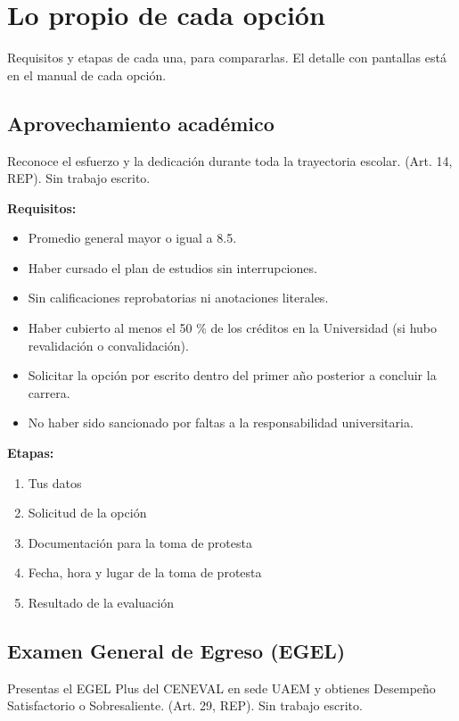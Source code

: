 \section{Lo propio de cada opción}
Requisitos y etapas de cada una, para compararlas. El detalle con pantallas está en el manual de cada opción.
\subsection{Aprovechamiento académico}
Reconoce el esfuerzo y la dedicación durante toda la trayectoria escolar. (Art. 14, REP). Sin trabajo escrito.

\textbf{Requisitos:}
\begin{itemize}
  \item Promedio general mayor o igual a 8.5.
  \item Haber cursado el plan de estudios sin interrupciones.
  \item Sin calificaciones reprobatorias ni anotaciones literales.
  \item Haber cubierto al menos el 50 \% de los créditos en la Universidad (si hubo revalidación o convalidación).
  \item Solicitar la opción por escrito dentro del primer año posterior a concluir la carrera.
  \item No haber sido sancionado por faltas a la responsabilidad universitaria.
\end{itemize}
\textbf{Etapas:}
\begin{enumerate}
  \item Tus datos
  \item Solicitud de la opción
  \item Documentación para la toma de protesta
  \item Fecha, hora y lugar de la toma de protesta
  \item Resultado de la evaluación
\end{enumerate}
\subsection{Examen General de Egreso (EGEL)}
Presentas el EGEL Plus del CENEVAL en sede UAEM y obtienes Desempeño Satisfactorio o Sobresaliente. (Art. 29, REP). Sin trabajo escrito.

